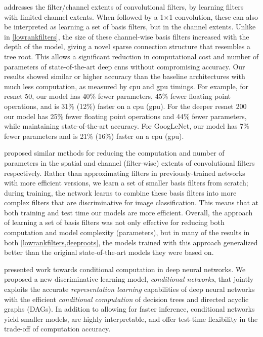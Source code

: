 \documentclass[thesis]{subfiles}
\begin{document}
 addresses the filter/channel extents of convolutional filters, by learning filters with limited channel extents. When followed by a 1$\times$1 convolution, these can also be interpreted as learning a set of basis filters, but in the channel extents. 
Unlike in \cref{lowrankfilters}, the size of these channel-wise basis filters increased with the depth of the model, giving a novel sparse connection structure that resembles a tree root. This allows a significant reduction in computational cost and number of parameters of state-of-the-art deep \glspl{cnn} without compromising accuracy. Our results showed similar or higher accuracy than the baseline architectures with much less computation, as measured by \gls{cpu} and \gls{gpu} timings. For example, for \gls{resnet} 50, our model has 40\% fewer parameters, 45\% fewer floating point operations, and is 31\% (12\%) faster on a \gls{cpu} (\gls{gpu}). For the deeper \gls{resnet} 200 our model has 25\% fewer floating point operations and 44\% fewer parameters, while maintaining state-of-the-art accuracy. For GoogLeNet, our model has 7\% fewer parameters and is 21\% (16\%) faster on a \gls{cpu} (\gls{gpu}).

 proposed similar methods for reducing the computation and number of parameters in the spatial and channel (filter-wise) extents of convolutional filters respectively. Rather than approximating filters in previously-trained networks with more efficient versions, we learn a set of smaller basis filters from scratch; during training, the network learns to combine these basis filters into more complex filters that are discriminative for image classification. This means that at both training and test time our models are more efficient. Overall, the approach of learning a set of basis filters was not only effective for reducing both computation and model complexity (parameters), but in many of the results in both \cref{lowrankfilters,deeproots}, the models trained with this approach generalized better than the original state-of-the-art models they were based on.

 presented work towards conditional computation in deep neural networks. We proposed a new discriminative learning model, \emph{conditional networks}, 
that jointly exploits the accurate \emph{representation learning} capabilities of deep neural networks with the efficient \emph{conditional computation} of decision trees and directed acyclic graphs (DAGs). In addition to allowing for faster inference, conditional networks yield smaller models, are highly interpretable, and offer test-time flexibility in the trade-off of computation \vs accuracy.
\end{document}

